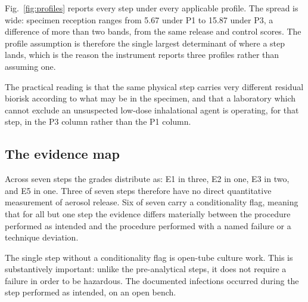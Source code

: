 Fig.~\ref{fig:profiles} reports every step under every applicable profile. The spread is
wide: specimen reception ranges from 5.67 under P1 to 15.87 under P3, a difference of more
than two bands, from the same release and control scores. The profile assumption is
therefore the single largest determinant of where a step lands, which is the reason the
instrument reports three profiles rather than assuming one.

The practical reading is that the same physical step carries very different residual
biorisk according to what may be in the specimen, and that a laboratory which cannot
exclude an unsuspected low-dose inhalational agent is operating, for that step, in the
P3 column rather than the P1 column.

\subsection{The evidence map}

Across seven steps the grades distribute as: E1 in three, E2 in one, E3 in two, and E5 in
one. Three of seven steps therefore have no direct quantitative measurement of aerosol
release. Six of seven carry a conditionality flag, meaning that for all but one step the
evidence differs materially between the procedure performed as intended and the procedure
performed with a named failure or a technique deviation.

The single step without a conditionality flag is open-tube culture work. This is
substantively important: unlike the pre-analytical steps, it does not require a failure in
order to be hazardous. The documented infections occurred during the step performed as
intended, on an open bench.
